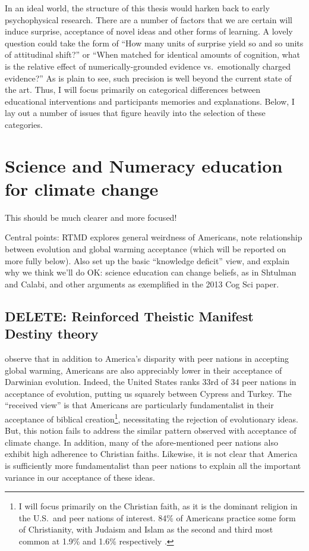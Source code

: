 In an ideal world, the structure of this thesis would harken back to early
psychophysical research. There are a number of factors that we are certain will
induce surprise, acceptance of novel ideas and other forms of learning. A
lovely question could take the form of ``How many units of surprise yield so and
so units of attitudinal shift?'' or ``When matched for identical amounts of
cognition, what is the relative effect of numerically-grounded evidence vs.\
emotionally charged evidence?'' As is plain to see, such precision is well
beyond the current state of the art. Thus, I will focus primarily on categorical
differences between educational interventions and participants memories and
explanations. Below, I lay out a number of issues that figure heavily into the
selection of these categories.

\section{Science and Numeracy education for climate change}

This should be much clearer and more focused! 

Central points: RTMD explores general weirdness of Americans, note relationship
between evolution and global warming acceptance (which will be reported on more
fully below). Also set up the basic “knowledge deficit” view, and explain why we
think we'll do OK: science education can change beliefs, as in Shtulman and
Calabi, and other arguments as exemplified in the 2013 Cog Sci paper.

\subsection{DELETE: Reinforced Theistic Manifest Destiny theory}


\citeauthor{ranney_why_2012} observe that in addition to America's disparity
with peer nations in accepting global warming, Americans are also appreciably
lower in their acceptance of Darwinian evolution. Indeed, the United States
ranks 33rd of 34 peer nations in acceptance of evolution, putting us
squarely between Cypress and Turkey. The ``received view'' is that Americans are
particularly fundamentalist in their acceptance of biblical creation\footnote{I
will focus primarily on the Christian faith, as it is the dominant religion in
the U.S.\ and peer nations of interest. 84\% of Americans practice some form of
Christianity, with Judaism and Islam as the second and third most common at
1.9\% and 1.6\% respectively \cite{wolfram_alpha_faith}.}, 
necessitating the rejection of evolutionary ideas. But, this notion fails to
address the similar pattern observed with acceptance of climate change. In
addition, many of the afore-mentioned peer nations also exhibit high adherence
to Christian faiths.  Likewise, it is not clear that America is sufficiently
more fundamentalist than peer nations to explain all the important variance in
our acceptance of these ideas. 

